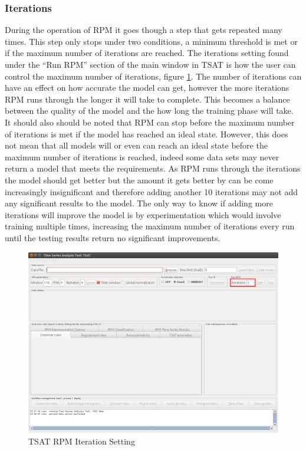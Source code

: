 \documentclass[titlepage, letterpaper, 12pt]{article}
\begin{document}
\newpage
\subsubsection{Iterations}
\label{iterations}
During the operation of RPM it goes though a step that gets repeated many times. This step only stops under two conditions, a minimum threshold is met or if the maximum number of iterations are reached. The iterations setting found under the ``Run RPM'' section of the main window in TSAT is how the user can control the maximum number of iterations, figure \ref{fig:TSAT-iteration-setting}. The number of iterations can have an effect on how accurate the model can get, however the more iterations RPM runs through the longer it will take to complete. This becomes a balance between the quality of the model and the how long the training phase will take. It should also should be noted that RPM can stop before the maximum number of iterations is met if the model has reached an ideal state. However, this does not mean that all models will or even can reach an ideal state before the maximum number of iterations is reached, indeed some data sets may never return a model that meets the requirements. As RPM runs through the iterations the model should get better but the amount it gets better by can be come increasingly insignificant and therefore adding another 10 iterations may not add any significant results to the model. The only way to know if adding more iterations will improve the model is by experimentation which would involve training multiple times, increasing the maximum number of iterations every run until the testing results return no significant improvements.

\begin{figure}[H]
	\includegraphics[width=\textwidth]{TSAT-iterations-setting}
	\caption{TSAT RPM Iteration Setting}
	\label{fig:TSAT-iteration-setting}
\end{figure}
\end{document}
